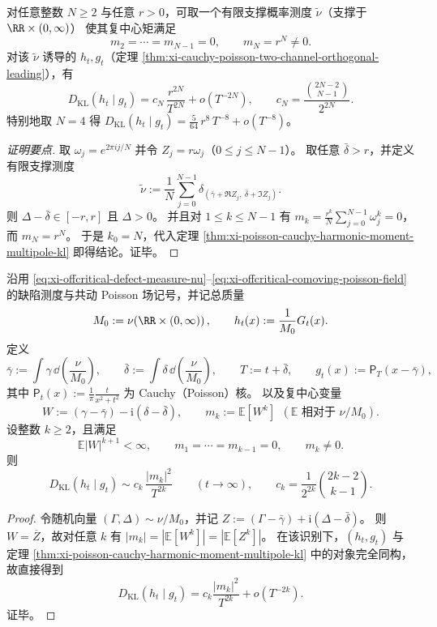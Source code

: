 \begin{proposition}[任意阶多极不可见性的显式构造与主部常数]\label{prop:xi-poisson-cauchy-multipole-invisibility-construction}
对任意整数 \(N\ge 2\) 与任意 \(r>0\)，可取一个有限支撑概率测度 \(\tilde\nu\)（支撑于 \(\RR\times(0,\infty)\)）
使其复中心矩满足
\[
m_2=\cdots=m_{N-1}=0,
\qquad
m_N=r^N\neq 0.
\]
对该 \(\tilde\nu\) 诱导的 \(h_t,g_t\)（定理 \ref{thm:xi-cauchy-poisson-two-channel-orthogonal-leading}），有
\[
D_{\mathrm{KL}}(h_t\mid g_t)
=c_N\,\frac{r^{2N}}{T^{2N}}+o(T^{-2N}),
\qquad
c_N=\frac{\binom{2N-2}{N-1}}{2^{2N}}.
\]
特别地取 \(N=4\) 得
\(
D_{\mathrm{KL}}(h_t\mid g_t)=\frac{5}{64}\,r^8\,T^{-8}+o(T^{-8})
\)。
\end{proposition}
\begin{proof}[证明要点]
取 \(\omega_j=e^{2\pi ij/N}\) 并令 \(Z_j=r\omega_j\)（\(0\le j\le N-1\)）。
取任意 \(\bar\delta>r\)，并定义有限支撑测度
\[
\tilde\nu:=\frac{1}{N}\sum_{j=0}^{N-1}\delta_{(\bar\gamma+\Re Z_j,\ \bar\delta+\Im Z_j)}.
\]
则 \(\Delta-\bar\delta\in[-r,r]\) 且 \(\Delta>0\)。
并且对 \(1\le k\le N-1\) 有
\(
m_k=\frac{r^k}{N}\sum_{j=0}^{N-1}\omega_j^k=0
\)，而 \(m_N=r^N\)。
于是 \(k_0=N\)，代入定理 \ref{thm:xi-poisson-cauchy-harmonic-moment-multipole-kl} 即得结论。证毕。
\end{proof}

\begin{theorem}[缺陷测度归一化框架下的复多极主导律]\label{thm:xi-poisson-defect-measure-complex-multipole-kl}
沿用
\eqref{eq:xi-offcritical-defect-measure-nu}--\eqref{eq:xi-offcritical-comoving-poisson-field}
的缺陷测度与共动 Poisson 场记号，并记总质量
\[
M_0:=\nu\!\left(\RR\times(0,\infty)\right),\qquad
h_t(x):=\frac{1}{M_0}G_t(x).
\]
定义
\[
\bar\gamma:=\int \gamma\,\dd\!\left(\frac{\nu}{M_0}\right),\qquad
\bar\delta:=\int \delta\,\dd\!\left(\frac{\nu}{M_0}\right),\qquad
T:=t+\bar\delta,\qquad
g_t(x):=\mathsf P_T(x-\bar\gamma),
\]
其中
\(
\mathsf P_t(x):=\frac{1}{\pi}\frac{t}{x^2+t^2}
\)
为 Cauchy（Poisson）核。
以及复中心变量
\[
W:=(\gamma-\bar\gamma)-\mathrm{i}(\delta-\bar\delta),\qquad
m_k:=\mathbb E[W^k]\ \ (\mathbb E\text{ 相对于 }\nu/M_0).
\]
设整数 \(k\ge 2\)，且满足
\[
\mathbb E|W|^{k+1}<\infty,\qquad
m_1=\cdots=m_{k-1}=0,\qquad
m_k\neq 0.
\]
则
\[
D_{\mathrm{KL}}(h_t\mid g_t)\sim c_k\,\frac{|m_k|^2}{T^{2k}}
\qquad(t\to\infty),
\qquad
c_k=\frac{1}{2^{2k}}\binom{2k-2}{k-1}.
\]
\end{theorem}
\begin{proof}
令随机向量
\(
(\Gamma,\Delta)\sim \nu/M_0
\)，并记
\(
Z:=(\Gamma-\bar\gamma)+\mathrm{i}(\Delta-\bar\delta)
\)。
则 \(W=\overline Z\)，故对任意 \(k\) 有
\(
|m_k|=|\mathbb E[W^k]|=|\mathbb E[Z^k]|
\)。
在该识别下，\((h_t,g_t)\) 与定理
\ref{thm:xi-poisson-cauchy-harmonic-moment-multipole-kl}
中的对象完全同构，故直接得到
\[
D_{\mathrm{KL}}(h_t\mid g_t)
=c_k\frac{|m_k|^2}{T^{2k}}+o(T^{-2k}).
\]
证毕。
\end{proof}

